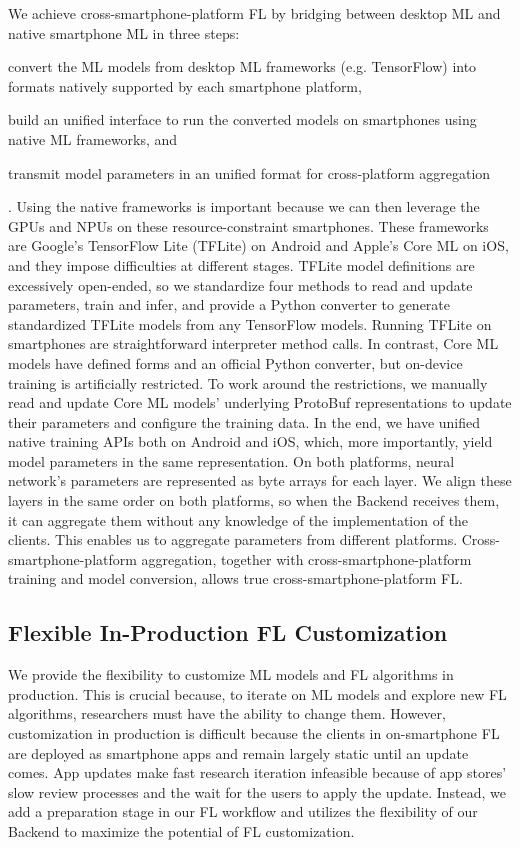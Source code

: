 \documentclass[letterpaper]{article} %
\begin{document}
We achieve cross-smartphone-platform FL by bridging between
desktop ML and native smartphone ML in three steps:
\begin{enumerate*}[label=\arabic*.]
    \item convert the ML models from desktop ML frameworks (e.g. TensorFlow)
        into formats natively supported by each smartphone platform,
    \item build an unified interface to run the converted models on smartphones
        using native ML frameworks, and
    \item transmit model parameters in an unified format for
        cross-platform aggregation
\end{enumerate*}.
Using the native frameworks is important because
we can then leverage the GPUs and NPUs on these resource-constraint smartphones.
These frameworks are Google's TensorFlow Lite (TFLite) on Android and
Apple's Core ML on iOS,
and they impose difficulties at different stages.
TFLite model definitions are excessively open-ended,
so we standardize four methods to read and update parameters,
train and infer, and
provide a Python converter to generate standardized TFLite models from
any TensorFlow models.
Running TFLite on smartphones are straightforward interpreter method calls.
In contrast, Core ML models have defined forms and an official Python converter,
but on-device training is artificially restricted.
To work around the restrictions,
we manually read and update Core ML models' underlying ProtoBuf representations
to update their parameters and configure the training data.
In the end, we have unified native training APIs both on Android and iOS,
which, more importantly, yield model parameters in the same representation.
On both platforms, neural network's parameters are represented as byte arrays
for each layer.
We align these layers in the same order on both platforms,
so when the Backend receives them,
it can aggregate them without any knowledge of
the implementation of the clients.
This enables us to aggregate parameters from different platforms.
Cross-smartphone-platform aggregation,
together with cross-smartphone-platform training and model conversion,
allows true cross-smartphone-platform FL.

\subsection{Flexible In-Production FL Customization}
\newcommand{\model}{$M$}
\newcommand{\fs}{$S_\mathrm F$}
We provide the flexibility to customize ML models and FL algorithms
in production.
This is crucial because, to iterate on ML models and explore new FL algorithms,
researchers must have the ability to change them.
However, customization in production is difficult because
the clients in on-smartphone FL are deployed as smartphone apps and
remain largely static until an update comes.
App updates make fast research iteration infeasible because of
app stores' slow review processes and
the wait for the users to apply the update.
Instead, we add a preparation stage in our FL workflow and
utilizes the flexibility of our Backend to
maximize the potential of FL customization.
\end{document}
